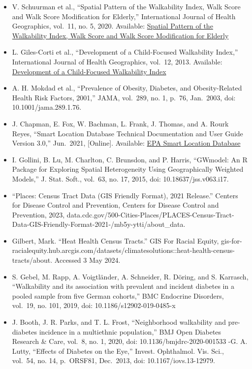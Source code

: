 \documentclass[
]{article}
\begin{document}
\begin{itemize}
\item
  V. Schuurman et al., ``Spatial Pattern of the Walkability Index, Walk
  Score and Walk Score Modification for Elderly,'' International Journal
  of Health Geographics, vol.~11, no. 5, 2020. Available:
  \href{https://www.mdpi.com/2220-9964/11/5/279}{Spatial Pattern of the
  Walkability Index, Walk Score and Walk Score Modification for Elderly}
\item
  L. Giles-Corti et al., ``Development of a Child-Focused Walkability
  Index,'' International Journal of Health Geographics, vol.~12, 2013.
  Available:
  \href{https://ij-healthgeographics.biomedcentral.com/articles/10.1186/1476-072X-12-61}{Development
  of a Child-Focused Walkability Index}
\item
  A. H. Mokdad et al., ``Prevalence of Obesity, Diabetes, and
  Obesity-Related Health Risk Factors, 2001,'' JAMA, vol.~289, no. 1,
  p.~76, Jan.~2003, doi: 10.1001/jama.289.1.76.
\item
  J. Chapman, E. Fox, W. Bachman, L. Frank, J. Thomas, and A. Rourk
  Reyes, ``Smart Location Database Technical Documentation and User
  Guide Version 3.0,'' Jun.~2021, {[}Online{]}. Available:
  \href{https://www.epa.gov/system/files/documents/2023-10/epa_sld_3.0_technicaldocumentationuserguide_may2021_0.pdf}{EPA
  Smart Location Database}
\item
  I. Gollini, B. Lu, M. Charlton, C. Brunsdon, and P. Harris, ``GWmodel:
  An R Package for Exploring Spatial Heterogeneity Using Geographically
  Weighted Models,'' J. Stat. Soft., vol.~63, no. 17, 2015, doi:
  10.18637/jss.v063.i17.
\item
  ``Places: Census Tract Data (GIS Friendly Format), 2021 Release.''
  Centers for Disease Control and Prevention, Centers for Disease
  Control and Prevention, 2023,
  data.cdc.gov/500-Cities-Places/PLACES-Census-Tract-Data-GIS-Friendly-Format-2021-/mb5y-ytti/about\_data.
\item
  Gilbert, Mark. ``Heat Health Census Tracts.'' GIS For Racial Equity,
  gis-for-racialequity.hub.arcgis.com/datasets/climatesolutions::heat-health-census-tracts/about.
  Accessed 3 May 2024.
\item
  S. Gebel, M. Rapp, A. Voigtländer, A. Schneider, R. Döring, and S.
  Karrasch, ``Walkability and its association with prevalent and
  incident diabetes in a pooled sample from five German cohorts,'' BMC
  Endocrine Disorders, vol.~19, no. 101, 2019, doi:
  10.1186/s12902-019-0485-x
\item
  J. Booth, J. R. Parks, and T. L. Frost, ``Neighborhood walkability and
  pre-diabetes incidence in a multiethnic population,'' BMJ Open
  Diabetes Research \& Care, vol.~8, no. 1, 2020, doi:
  10.1136/bmjdrc-2020-001533 -G. A. Lutty, ``Effects of Diabetes on the
  Eye,'' Invest. Ophthalmol. Vis. Sci., vol.~54, no. 14, p.~ORSF81,
  Dec.~2013, doi: 10.1167/iovs.13-12979.
\end{itemize}
\end{document}
